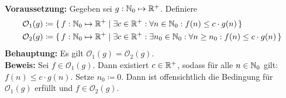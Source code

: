 \documentclass[a4paper,11pt]{article}             %
\begin{document}
\setcounter{excnt}{13}
\begin{ex}
  \leavevmode
  \begin{exlist}
  \item \label{ex:14a}  
   \textbf{Voraussetzung:} Gegeben sei $g:\mathbb{N}_0\mapsto\mathbb{R}^+$. Definiere
     \begin{align*}
      \mathcal{O}_1(g) &\coloneqq \set{f:\mathbb{N}_0\mapsto\mathbb{R}^+ | \exists c\in\mathbb{R}^+:\forall n\in\mathbb{N}_0:f(n)\leq c\cdot g(n)} \\
      \mathcal{O}_2(g) &\coloneqq \set{f:\mathbb{N}_0\mapsto\mathbb{R}^+ | \exists c\in\mathbb{R}^+:\exists n_0\in\mathbb{N}_0:\forall n\geq n_0:f(n)\leq c\cdot g(n)} \\
     \end{align*}
  \textbf{Behauptung:} Es gilt $\mathcal{O}_1(g)=\mathcal{O}_2(g)$. \\
\textbf{Beweis:}
Sei $f\in\mathcal{O}_1(g)$. Dann existiert $c\in\mathbb{R}^+$, sodass für alle
$n\in\mathbb{N}_0$ gilt: $f(n)\leq c\cdot g(n)$. Setze $n_0\coloneqq 0$. Dann ist
offensichtlich die Bedingung für $\mathcal{O}_1(g)$ erfüllt und
$f\in\mathcal{O}_2(g)$.


\end{exlist}
\end{ex}
\end{document}
